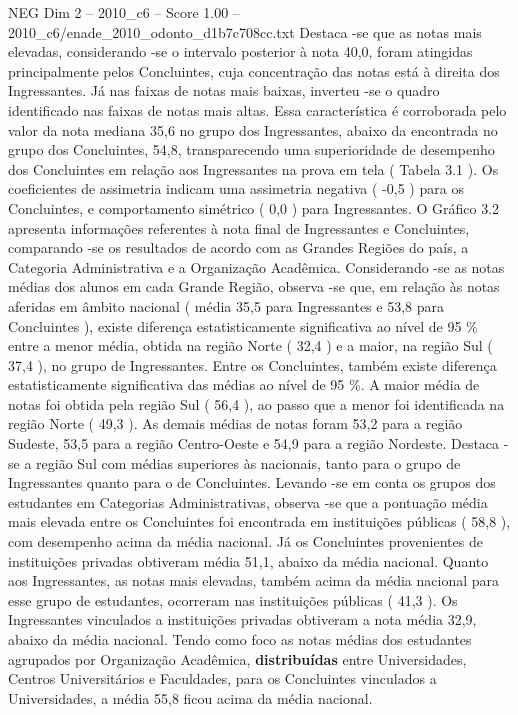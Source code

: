 \begin{textsample}{NEG Dim 2 – 2010\_c6 – Score 1.00 – 2010\_c6/enade\_2010\_odonto\_d1b7c708cc.txt}
Destaca -se que as notas mais elevadas, considerando -se o intervalo posterior à nota 40,0, foram atingidas principalmente pelos Concluintes, cuja concentração das notas está à direita dos Ingressantes.
Já nas faixas de notas mais baixas, inverteu -se o quadro identificado nas faixas de notas mais altas.
Essa característica é corroborada pelo valor da nota mediana 35,6 no grupo dos Ingressantes, abaixo da encontrada no grupo dos Concluintes, 54,8, transparecendo uma superioridade de desempenho dos Concluintes em relação aos Ingressantes na prova em tela ( Tabela 3.1 ).
Os coeficientes de assimetria indicam uma assimetria negativa ( -0,5 ) para os Concluintes, e comportamento simétrico ( 0,0 ) para Ingressantes.
O Gráfico 3.2 apresenta informações referentes à nota final de Ingressantes e Concluintes, comparando -se os resultados de acordo com as Grandes Regiões do país, a Categoria Administrativa e a Organização Acadêmica.
Considerando -se as notas médias dos alunos em cada Grande Região, observa -se que, em relação às notas aferidas em âmbito nacional ( média 35,5 para Ingressantes e 53,8 para Concluintes ), existe diferença estatisticamente significativa ao nível de 95 \% entre a menor média, obtida na região Norte ( 32,4 ) e a maior, na região Sul ( 37,4 ), no grupo de Ingressantes.
Entre os Concluintes, também existe diferença estatisticamente significativa das médias ao nível de 95 \%.
A maior média de notas foi obtida pela região Sul ( 56,4 ), ao passo que a menor foi identificada na região Norte ( 49,3 ).
As demais médias de notas foram 53,2 para a região Sudeste, 53,5 para a região Centro-Oeste e 54,9 para a região Nordeste.
Destaca -se a região Sul com médias superiores às nacionais, tanto para o grupo de Ingressantes quanto para o de Concluintes.
Levando -se em conta os grupos dos estudantes em Categorias Administrativas, observa -se que a pontuação média mais elevada entre os Concluintes foi encontrada em instituições públicas ( 58,8 ), com desempenho acima da média nacional.
Já os Concluintes provenientes de instituições privadas obtiveram média 51,1, abaixo da média nacional.
Quanto aos Ingressantes, as notas mais elevadas, também acima da média nacional para esse grupo de estudantes, ocorreram nas instituições públicas ( 41,3 ).
Os Ingressantes vinculados a instituições privadas obtiveram a nota média 32,9, abaixo da média nacional.
Tendo como foco as notas médias dos estudantes agrupados por Organização Acadêmica, \textbf{distribuídas} entre Universidades, Centros Universitários e Faculdades, para os Concluintes vinculados a Universidades, a média 55,8 ficou acima da média nacional.

\end{textsample}
